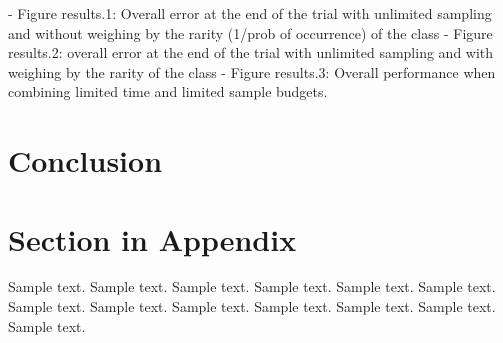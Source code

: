 \documentclass[preprint,12pt,3p]{elsarticle}
\begin{document}
- Figure results.1: Overall error at the end of the trial with unlimited sampling and without weighing by the rarity (1/prob of occurrence) of the class
- Figure results.2: overall error at the end of the trial with unlimited sampling and with weighing by the rarity of the class
- Figure results.3: Overall performance when combining limited time and limited sample budgets.

\section{Conclusion}
\label{sec:conclusion}

\appendix

\section{Section in Appendix}
\label{appendix-sec1}

	Sample text. Sample text. Sample text. Sample text. Sample text. Sample text. 
	Sample text. Sample text. Sample text. Sample text. Sample text. Sample text. 
	Sample text. 







\end{document}
